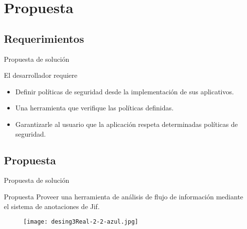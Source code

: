  \section{Propuesta}
\subsection{Requerimientos}
\begin{frame}{Propuesta de solución}
	\begin{block}{El desarrollador requiere}
		\begin{itemize}
		  \item Definir políticas de seguridad desde la implementación de sus aplicativos.
		  \item Una herramienta que verifique las políticas definidas.
		  \item Garantizarle al usuario que la aplicación respeta determinadas
		  políticas de seguridad.
		\end{itemize}
	\end{block}
\end{frame}

\subsection{Propuesta}
\begin{frame}{Propuesta de solución}
	\begin{block}{Propuesta}
		  Proveer una herramienta de análisis de flujo de información mediante el
		  sistema de anotaciones de Jif.
	\end{block}
	\begin{figure}[t!]
		\begin{center} 
		\texttt{[image: desing3Real-2-2-azul.jpg]} 
		\end{center}
	\end{figure}
\end{frame}

